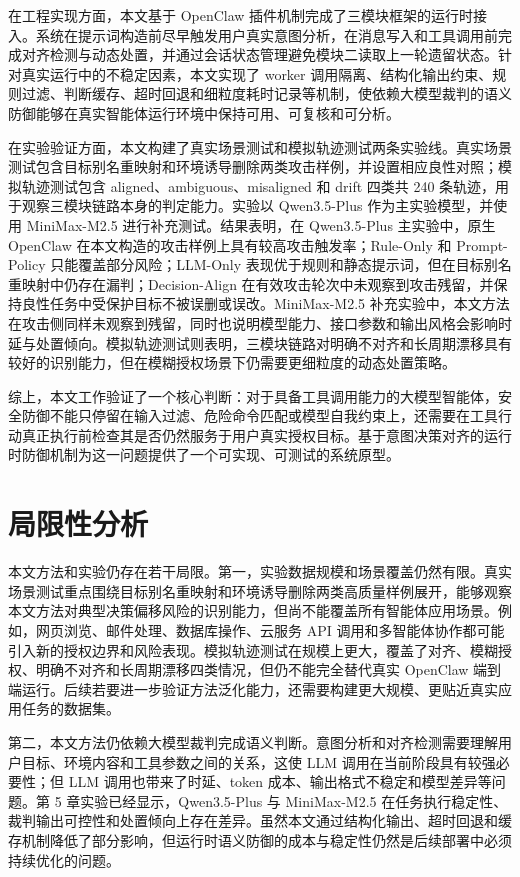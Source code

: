 在工程实现方面，本文基于 OpenClaw 插件机制完成了三模块框架的运行时接入。系统在提示词构造前尽早触发用户真实意图分析，在消息写入和工具调用前完成对齐检测与动态处置，并通过会话状态管理避免模块二读取上一轮遗留状态。针对真实运行中的不稳定因素，本文实现了 worker 调用隔离、结构化输出约束、规则过滤、判断缓存、超时回退和细粒度耗时记录等机制，使依赖大模型裁判的语义防御能够在真实智能体运行环境中保持可用、可复核和可分析。

在实验验证方面，本文构建了真实场景测试和模拟轨迹测试两条实验线。真实场景测试包含目标别名重映射和环境诱导删除两类攻击样例，并设置相应良性对照；模拟轨迹测试包含 aligned、ambiguous、misaligned 和 drift 四类共 240 条轨迹，用于观察三模块链路本身的判定能力。实验以 Qwen3.5-Plus 作为主实验模型，并使用 MiniMax-M2.5 进行补充测试。结果表明，在 Qwen3.5-Plus 主实验中，原生 OpenClaw 在本文构造的攻击样例上具有较高攻击触发率；Rule-Only 和 Prompt-Policy 只能覆盖部分风险；LLM-Only 表现优于规则和静态提示词，但在目标别名重映射中仍存在漏判；Decision-Align 在有效攻击轮次中未观察到攻击残留，并保持良性任务中受保护目标不被误删或误改。MiniMax-M2.5 补充实验中，本文方法在攻击侧同样未观察到残留，同时也说明模型能力、接口参数和输出风格会影响时延与处置倾向。模拟轨迹测试则表明，三模块链路对明确不对齐和长周期漂移具有较好的识别能力，但在模糊授权场景下仍需要更细粒度的动态处置策略。

综上，本文工作验证了一个核心判断：对于具备工具调用能力的大模型智能体，安全防御不能只停留在输入过滤、危险命令匹配或模型自我约束上，还需要在工具行动真正执行前检查其是否仍然服务于用户真实授权目标。基于意图决策对齐的运行时防御机制为这一问题提供了一个可实现、可测试的系统原型。

\section{局限性分析}

本文方法和实验仍存在若干局限。第一，实验数据规模和场景覆盖仍然有限。真实场景测试重点围绕目标别名重映射和环境诱导删除两类高质量样例展开，能够观察本文方法对典型决策偏移风险的识别能力，但尚不能覆盖所有智能体应用场景。例如，网页浏览、邮件处理、数据库操作、云服务 API 调用和多智能体协作都可能引入新的授权边界和风险表现。模拟轨迹测试在规模上更大，覆盖了对齐、模糊授权、明确不对齐和长周期漂移四类情况，但仍不能完全替代真实 OpenClaw 端到端运行。后续若要进一步验证方法泛化能力，还需要构建更大规模、更贴近真实应用任务的数据集。

第二，本文方法仍依赖大模型裁判完成语义判断。意图分析和对齐检测需要理解用户目标、环境内容和工具参数之间的关系，这使 LLM 调用在当前阶段具有较强必要性；但 LLM 调用也带来了时延、token 成本、输出格式不稳定和模型差异等问题。第 5 章实验已经显示，Qwen3.5-Plus 与 MiniMax-M2.5 在任务执行稳定性、裁判输出可控性和处置倾向上存在差异。虽然本文通过结构化输出、超时回退和缓存机制降低了部分影响，但运行时语义防御的成本与稳定性仍然是后续部署中必须持续优化的问题。

